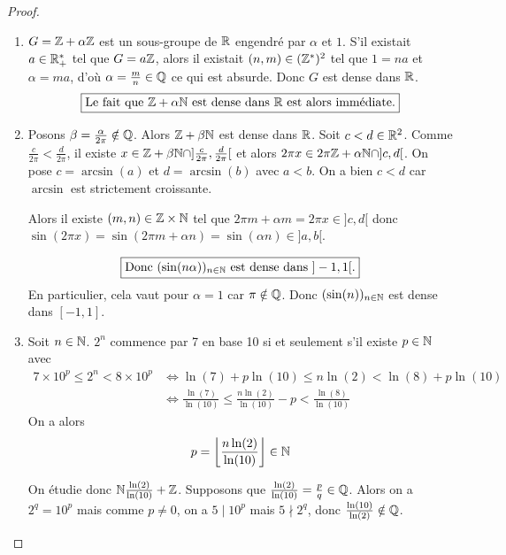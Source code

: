 \begin{proof}
	\phantom{}
	\begin{enumerate}
		\item $G=\mathbb{Z}+\alpha\mathbb{Z}$ est un sous-groupe de $\mathbb{R}$ engendré par $\alpha$ et $1$. S'il existait $a\in\mathbb{R}_{+}^{*}$ tel que $G=a\mathbb{Z}$, alors il existait $(n,m)\in(\mathbb{Z}^{*})^{2}$ tel que $1=na$ et $\alpha=ma$, d'où $\alpha=\frac{m}{n}\in\mathbb{Q}$ ce qui est absurde. Donc $G$ est dense dans $\mathbb{R}$. 
		\begin{equation}
			\boxed{\text{Le fait que }\mathbb{Z}+\alpha\mathbb{N}\text{ est dense dans }\mathbb{R}\text{ est alors immédiate.}}
		\end{equation}

		\item Posons $\beta=\frac{\alpha}{2\pi}\notin\mathbb{Q}$. Alors $\mathbb{Z}+\beta\mathbb{N}$ est dense dans $\mathbb{R}$. Soit $c<d\in\mathbb{R}^{2}$. Comme $\frac{c}{2\pi}<\frac{d}{2\pi}$, il existe $x\in\mathbb{Z}+\beta\mathbb{N}\cap]\frac{c}{2\pi},\frac{d}{2\pi}[$ et alors $2\pi x\in2\pi\mathbb{Z}+\alpha\mathbb{N}\cap]c,d[$. On pose $c=\arcsin(a)$ et $d=\arcsin(b)$ avec $a<b$. On a bien $c<d$ car $\arcsin$ est strictement croissante.
		
		Alors il existe $(m,n)\in\mathbb{Z}\times\mathbb{N}$ tel que $2\pi m+\alpha m=2\pi x\in]c,d[$ donc $\sin(2\pi x)=\sin(2\pi m+\alpha n)=\sin(\alpha n)\in]a,b[$.

		\begin{equation}
			\boxed{\text{Donc }(\sin(n\alpha))_{n\in\mathbb{N}}\text{ est dense dans }]-1,1[.}
		\end{equation}
		En particulier, cela vaut pour $\alpha=1$ car $\pi\notin\mathbb{Q}$. Donc $(\sin(n))_{n\in\mathbb{N}}$ est dense dans $[-1,1]$.

		\item Soit $n\in\mathbb{N}$. $2^{n}$ commence par 7 en base 10 si et seulement s'il existe $p\in\mathbb{N}$ avec 
		\begin{align}
			7\times10^{p}\leqslant2^{n}<8\times10^{p}
			&\Longleftrightarrow \ln(7)+p\ln(10)\leqslant n\ln(2)<\ln(8)+p\ln(10)\\
			&\Longleftrightarrow \frac{\ln(7)}{\ln(10)}\leqslant\frac{n\ln(2)}{\ln(10)}-p<\frac{\ln(8)}{\ln(10)}
		\end{align}
		On a alors 
		\begin{equation}
			p=\left\lfloor\frac{n\ln(2)}{\ln(10)}\right\rfloor\in\mathbb{N}
		\end{equation}

		On étudie donc $\mathbb{N}\frac{\ln(2)}{\ln(10)}+\mathbb{Z}$. Supposons que $\frac{\ln(2)}{\ln(10)}=\frac{p}{q}\in\mathbb{Q}$. Alors on a $2^{q}=10^{p}$ mais comme $p\neq0$, on a $5\mid 10^{p}$ mais $5\nmid 2^{q}$, donc $\frac{\ln(10)}{\ln(2)}\notin\mathbb{Q}$.


\end{enumerate}
\end{proof}
